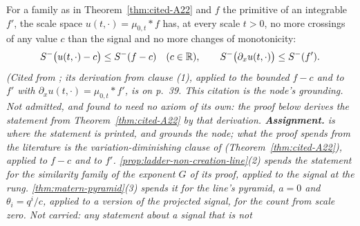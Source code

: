 \begin{theorem}
\label{thm:cited-A23}
\leanok
{}
For a family as in Theorem~\ref{thm:cited-A22} and $f$ the primitive of an integrable $f'$, the
scale space $u(t,\cdot) = \mu_{0,t} * f$ has, at every scale $t > 0$, no more crossings of any
value $c$ than the signal and no more changes of monotonicity:
\[
  S^-\bigl(u(t,\cdot) - c\bigr) \le S^-(f - c) \quad (c \in \mathbb{R}), \qquad
  S^-\bigl(\partial_x u(t,\cdot)\bigr) \le S^-(f').
\]
\statusA\quad{}\quad\emph{(Cited from ; its
derivation from clause (1), applied to the bounded $f - c$ and to $f'$ with
$\partial_x u(t,\cdot) = \mu_{0,t} * f'$, is on p.~39. This citation is the node's grounding. Not
admitted, and found to need no axiom of its own: the proof below derives the statement from
Theorem~\ref{thm:cited-A22} by that derivation. \textbf{Assignment.}  is where the statement
is printed, and grounds the node; what the proof spends from the literature is the
variation-diminishing clause of  (Theorem~\ref{thm:cited-A22}), applied to $f - c$ and to $f'$.
\ref{prop:ladder-non-creation-line}(2) spends the statement for the similarity family of the exponent $G$ of
its proof, applied to the signal at the rung. \ref{thm:matern-pyramid}(3) spends it for the
line's \Matern{} pyramid, $a = 0$ and $\theta_i = q^i/c$, applied to a version of the projected
signal, for the count from scale zero. Not carried: any statement about a signal that is not
}
\end{theorem}
